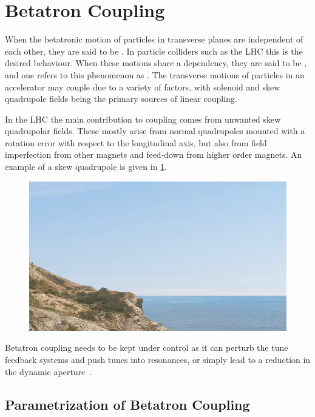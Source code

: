 
\section{Betatron Coupling}
\label{section:betatron_coupling}

When the betatronic motion of particles in transverse planes are independent of each other, they are said to be .
In particle colliders such as the LHC this is the desired behaviour.
When these motions share a dependency, they are said to be , and one refers to this phenomenon as .
The transverse motions of particles in an accelerator may couple due to a variety of factors, with solenoid and skew quadrupole fields being the primary sources of linear coupling.

In the LHC the main contribution to coupling comes from unwanted skew quadrupolar fields.
These mostly arise from normal quadrupoles mounted with a rotation error with respect to the longitudinal axis, but also from field imperfection from other magnets and feed-down from higher order magnets.
An example of a skew quadrupole is given in \cref{figure:skew_quadrupole}.

\begin{figure}[!htb]
    \centering
    \includegraphics[width = 0.5\linewidth]{Figures/placeholder.png}
    \caption{}
    \label{figure:skew_quadrupole}
\end{figure}

Betatron coupling needs to be kept under control as it can perturb the tune feedback systems and push tunes into resonances, or simply lead to a reduction in the dynamic aperture~\cite{PA:Ripken:Impact_Linear_Coupling_Nonlinear_Dynamics}.

\subsection{Parametrization of Betatron Coupling}
\label{subsection:parametrization_of_betatron_coupling}

